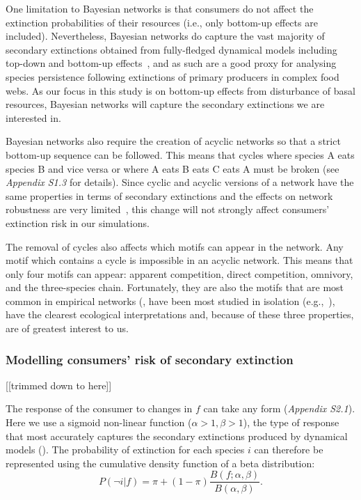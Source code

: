 \documentclass[12pt]{article}
\begin{document}
\begin{spacing}{2.0}
        One limitation to Bayesian networks is that consumers do not affect the extinction probabilities of their resources (i.e., only bottom-up effects are included).
        Nevertheless, Bayesian networks do capture the vast majority of secondary extinctions obtained from fully-fledged dynamical models including top-down and bottom-up effects~\citep{Eklof2013}, and as such are a good proxy for analysing species persistence following extinctions of primary producers in complex food webs.
        As our focus in this study is on bottom-up effects from disturbance of basal resources, Bayesian networks will capture the secondary extinctions we are interested in.

        
        Bayesian networks also require the creation of acyclic networks so that a strict bottom-up sequence can be followed. 
        This means that cycles where species A eats species B and vice versa or where A eats B eats C eats A must be broken (see \emph{Appendix S1.3} for details).
        Since cyclic and acyclic versions of a network have the same properties in terms of secondary extinctions and the effects on network robustness are very limited~\citep{Allesina2009functional}, this change will not strongly affect consumers' extinction risk in our simulations.

        
        The removal of cycles also affects which motifs can appear in the network. 
        Any motif which contains a cycle is impossible in an acyclic network.
        This means that only four motifs can appear: apparent competition, direct competition, omnivory, and the three-species chain.
        Fortunately, they are also the motifs that are most common in empirical networks (\citealp[]{Stouffer2007}, have been most studied in isolation (e.g.,~\citep{Hastings1991,Holt1987,Bascompte2005,Polis1989,Zabalo2012,Lefevre2009,Holt1997,Kondoh2008,McKinnon2013,Laws2013}), have the clearest ecological interpretations and, because of these three properties, are of greatest interest to us.


        \subsubsection*{Modelling consumers' risk of secondary extinction} [[trimmed down to here]]
        
        The response of the consumer to changes in $f$ can take any form (\emph{Appendix S2.1}). Here we use a sigmoid non-linear function ($\alpha > 1, \beta > 1$), the type of response that most accurately captures the secondary extinctions produced by dynamical models (\citealp[]{Eklof2013}).
		The probability of extinction for each species $i$ can therefore be represented using the cumulative density function of a beta distribution:
		\begin{equation}
		P(\lnot i|f) = \pi + (1 - \pi) \frac{B(f;\alpha,\beta)}{B(\alpha,\beta)}.
				\label{betafunc}
        \end{equation}
		

\end{spacing}
\end{document}
